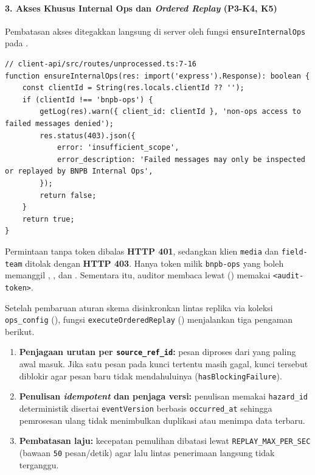 \paragraph*{3. Akses Khusus Internal Ops dan \textit{Ordered Replay} (P3-K4, K5)}
Pembatasan akses ditegakkan langsung di server oleh fungsi \texttt{ensureInternalOps} pada .

\begin{lstlisting}
// client-api/src/routes/unprocessed.ts:7-16
function ensureInternalOps(res: import('express').Response): boolean {
    const clientId = String(res.locals.clientId ?? '');
    if (clientId !== 'bnpb-ops') {
        getLog(res).warn({ client_id: clientId }, 'non-ops access to failed messages denied');
        res.status(403).json({
            error: 'insufficient_scope',
            error_description: 'Failed messages may only be inspected or replayed by BNPB Internal Ops',
        });
        return false;
    }
    return true;
}
\end{lstlisting}

Permintaan tanpa token dibalas \textbf{HTTP 401}, sedangkan klien \texttt{media} dan \texttt{field-team} ditolak dengan \textbf{HTTP 403}. Hanya token milik \texttt{bnpb-ops} yang boleh memanggil , , dan . Sementara itu, auditor membaca  lewat  () memakai \texttt{\textless{}audit-token\textgreater{}}.

Setelah pembaruan aturan skema disinkronkan lintas replika via koleksi \texttt{ops\_config} (), fungsi \texttt{execute\allowbreak Ordered\allowbreak Replay} () menjalankan tiga pengaman berikut.

\begin{enumerate}
  \item \textbf{Penjagaan urutan per \texttt{source\_ref\_id}:} pesan diproses dari yang paling awal masuk. Jika satu pesan pada kunci tertentu masih gagal, kunci tersebut diblokir agar pesan baru tidak mendahuluinya (\texttt{hasBlockingFailure}).
  \item \textbf{Penulisan \textit{idempotent} dan penjaga versi:} penulisan memakai \texttt{hazard\_id} deterministik disertai \texttt{eventVersion} berbasis \texttt{occurred\_at} sehingga pemrosesan ulang tidak menimbulkan duplikasi atau menimpa data terbaru.
  \item \textbf{Pembatasan laju:} kecepatan pemulihan dibatasi lewat \texttt{REPLAY\_MAX\_PER\_SEC} (bawaan \texttt{50} pesan/detik) agar lalu lintas penerimaan langsung tidak terganggu.
\end{enumerate}

